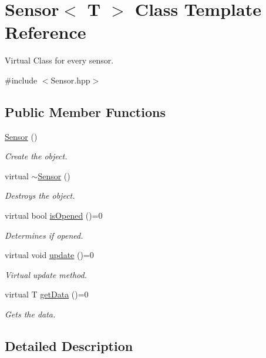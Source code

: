 \hypertarget{class_sensor}{}\section{Sensor$<$ T $>$ Class Template Reference}
\label{class_sensor}


Virtual Class for every sensor.  




{\ttfamily \#include $<$Sensor.\+hpp$>$}

\subsection*{Public Member Functions}
\begin{DoxyCompactItemize}
\item 
\hyperlink{class_sensor_aec4ccadfbcd62394d8eb7c067079c533}{Sensor} ()
\begin{DoxyCompactList}\small\item\em Create the object. \end{DoxyCompactList}\item 
virtual \hyperlink{class_sensor_a33f614626c02a1c7bc9529fd7b7b9888}{$\sim$\+Sensor} ()
\begin{DoxyCompactList}\small\item\em Destroys the object. \end{DoxyCompactList}\item 
virtual bool \hyperlink{class_sensor_a78f10e5c1fd3c7e5fcbbf4ca735ac1e7}{is\+Opened} ()=0
\begin{DoxyCompactList}\small\item\em Determines if opened. \end{DoxyCompactList}\item 
virtual void \hyperlink{class_sensor_a1766329f3c9918fa886ead46b141a6a8}{update} ()=0
\begin{DoxyCompactList}\small\item\em Virtual update method. \end{DoxyCompactList}\item 
virtual T \hyperlink{class_sensor_ae9ab3f3715367df03900706eb9806afd}{get\+Data} ()=0
\begin{DoxyCompactList}\small\item\em Gets the data. \end{DoxyCompactList}\end{DoxyCompactItemize}


\subsection{Detailed Description}

